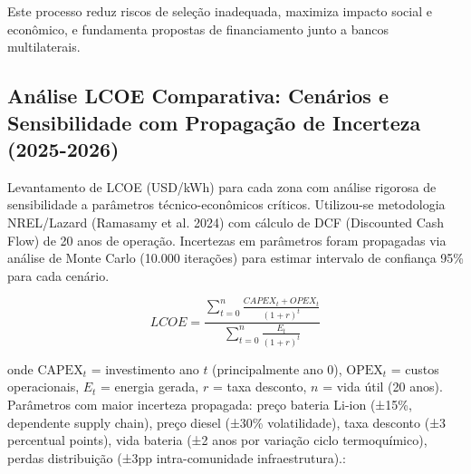 \documentclass[12pt, a4paper]{article}
\begin{document}
Este processo reduz riscos de seleção inadequada, maximiza impacto social e econômico, e fundamenta propostas de financiamento junto a bancos multilaterais.



\subsection{Análise LCOE Comparativa: Cenários e Sensibilidade com Propagação de Incerteza (2025-2026)}

Levantamento de LCOE (USD/kWh) para cada zona com análise rigorosa de sensibilidade a parâmetros técnico-econômicos críticos. Utilizou-se metodologia NREL/Lazard (Ramasamy et al. 2024) com cálculo de DCF (Discounted Cash Flow) de 20 anos de operação. Incertezas em parâmetros foram propagadas via análise de Monte Carlo (10.000 iterações) para estimar intervalo de confiança 95\% para cada cenário.

\begin{equation}
LCOE = \frac{\sum_{t=0}^{n} \frac{CAPEX_t + OPEX_t}{(1+r)^t}}{\sum_{t=0}^{n} \frac{E_t}{(1+r)^t}}
\end{equation}

onde $\text{CAPEX}_t$ = investimento ano $t$ (principalmente ano 0), $\text{OPEX}_t$ = custos operacionais, $E_t$ = energia gerada, $r$ = taxa desconto, $n$ = vida útil (20 anos). Parâmetros com maior incerteza propagada: preço bateria Li-ion (±15\%, dependente supply chain), preço diesel (±30\% volatilidade), taxa desconto (±3 percentual points), vida bateria (±2 anos por variação ciclo termoquímico), perdas distribuição (±3pp intra-comunidade infraestrutura).:
\end{document}
